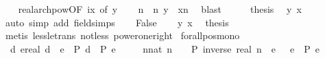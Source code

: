 \begin{isabellebody}
\ \ \isamarkupfalse%
\ real{\isacharunderscore}{\kern0pt}arch{\isacharunderscore}{\kern0pt}pow{\isacharbrackleft}{\kern0pt}OF\ ix{\isacharcomma}{\kern0pt}\ of\ {\isachardoublequoteopen}{}{\isacharslash}{\kern0pt}y{\isachardoublequoteclose}{\isacharbrackright}{\kern0pt}\isanewline
\ \ \isamarkupfalse%
\ n\ \ n{\isacharcolon}{\kern0pt}\ {\isachardoublequoteopen}{}{\isacharslash}{\kern0pt}y\ {\isacharless}{\kern0pt}\ {\isacharparenleft}{\kern0pt}{}{\isacharslash}{\kern0pt}x{\isacharparenright}{\kern0pt}{\isacharcircum}{\kern0pt}n{\isachardoublequoteclose}\ \isamarkupfalse%
\ blast\isanewline
\ \ \isamarkupfalse%
\ \isamarkupfalse%
\ {\isacharquery}{\kern0pt}thesis\ \isamarkupfalse%
\ y\ {\isacartoucheopen}x\ {\isachargreater}{\kern0pt}\ {}{\isacartoucheclose}\isanewline
\ \ \ \ \isamarkupfalse%
\ {\isacharparenleft}{\kern0pt}auto\ simp\ add{\isacharcolon}{\kern0pt}\ field{\isacharunderscore}{\kern0pt}simps{\isacharparenright}{\kern0pt}\isanewline
{}\isamarkupfalse%
\isanewline
\ \ \isamarkupfalse%
\ False\isanewline
\ \ \isamarkupfalse%
\ y\ x{}\ \isamarkupfalse%
\ {\isacharquery}{\kern0pt}thesis\isanewline
\ \ \ \ \isamarkupfalse%
\ {\isacharparenleft}{\kern0pt}metis\ less{\isacharunderscore}{\kern0pt}le{\isacharunderscore}{\kern0pt}trans\ not{\isacharunderscore}{\kern0pt}less\ power{\isacharunderscore}{\kern0pt}one{\isacharunderscore}{\kern0pt}right{\isacharparenright}{\kern0pt}\isanewline
{}\isamarkupfalse%
%
\endisatagproof
{\isafoldproof}%
%
\isadelimproof
\isanewline
%
\endisadelimproof
\isanewline
{}\isamarkupfalse%
\ forall{\isacharunderscore}{\kern0pt}pos{\isacharunderscore}{\kern0pt}mono{\isacharcolon}{\kern0pt}\isanewline
\ \ {\isachardoublequoteopen}{\isacharparenleft}{\kern0pt}{\isasymAnd}d\ e{\isacharcolon}{\kern0pt}{\isacharcolon}{\kern0pt}real{\isachardot}{\kern0pt}\ d\ {\isacharless}{\kern0pt}\ e\ {\isasymLongrightarrow}\ P\ d\ {\isasymLongrightarrow}\ P\ e{\isacharparenright}{\kern0pt}\ {\isasymLongrightarrow}\isanewline
\ \ \ \ {\isacharparenleft}{\kern0pt}{\isasymAnd}n{\isacharcolon}{\kern0pt}{\isacharcolon}{\kern0pt}nat{\isachardot}{\kern0pt}\ n\ {\isasymnoteq}\ {}\ {\isasymLongrightarrow}\ P\ {\isacharparenleft}{\kern0pt}inverse\ {\isacharparenleft}{\kern0pt}real\ n{\isacharparenright}{\kern0pt}{\isacharparenright}{\kern0pt}{\isacharparenright}{\kern0pt}\ {\isasymLongrightarrow}\ {\isacharparenleft}{\kern0pt}{\isasymAnd}e{\isachardot}{\kern0pt}\ {}\ {\isacharless}{\kern0pt}\ e\ {\isasymLongrightarrow}\ P\ e{\isacharparenright}{\kern0pt}{\isachardoublequoteclose}\isanewline

\end{isabellebody}

